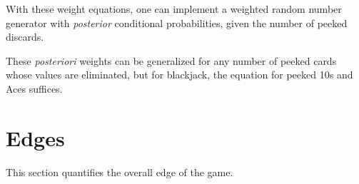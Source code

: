 \noindent
With these weight equations, 
one can implement a weighted random number generator with 
\emph{posterior} conditional probabilities, given the number
of peeked discards.  

These \emph{posteriori} weights can be generalized for any number of
peeked cards whose values are eliminated, but for blackjack, 
the equation for peeked 10s and Aces suffices.  

\section{Edges}
\label{sec:basic:edges}

This section quantifies the overall edge of the game.


